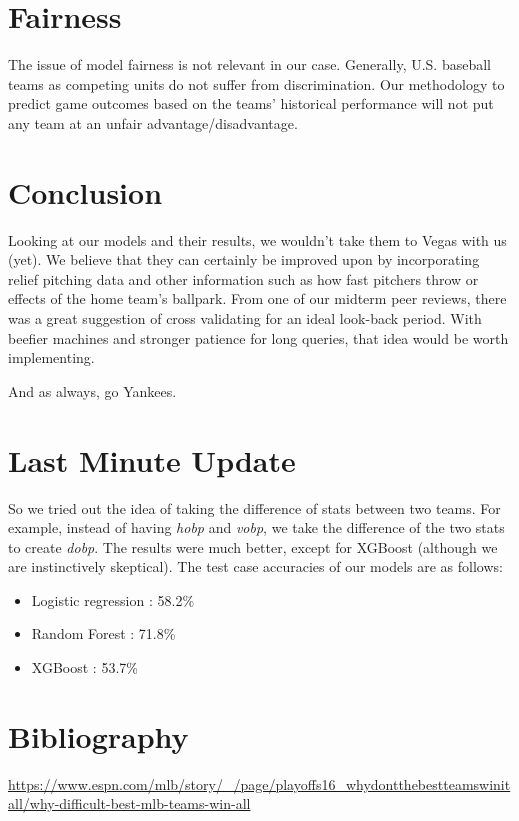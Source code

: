 \documentclass[12pt,onecolumn]{article}
\begin{document}
\section*{Fairness}
The issue of model fairness is not relevant in our case. Generally, U.S. baseball teams as competing units do not suffer from discrimination. Our methodology to predict game outcomes based on the teams’ historical performance will not put any team at an unfair advantage/disadvantage.

\section*{Conclusion}
Looking at our models and their results, we wouldn't take them to Vegas with us (yet). We believe that they can certainly be improved upon by incorporating relief pitching data and other information such as how fast pitchers throw or effects of the home team's ballpark. From one of our midterm peer reviews, there was a great suggestion of cross validating for an ideal look-back period. With beefier machines and stronger patience for long queries, that idea would be worth implementing. \vspace*{4mm}

\noindent
And as always, go Yankees.

\section*{Last Minute Update}
So we tried out the idea of taking the difference of stats between two teams. For example, instead of having \textit{h\textunderscore obp} and \textit{v\textunderscore obp}, we take the difference of the two stats to create \textit{d\textunderscore obp}. The results were much better, except for XGBoost (although we are instinctively skeptical). The test case accuracies of our models are as follows:
\begin{itemize}
\item Logistic regression : 58.2\%
\item Random Forest : 71.8\%
\item XGBoost : 53.7\%
\end{itemize}

\section*{Bibliography}
\url{https://www.espn.com/mlb/story/_/page/playoffs16_whydontthebestteamswinitall/why-difficult-best-mlb-teams-win-all} \vspace*{4mm}
\end{document}
